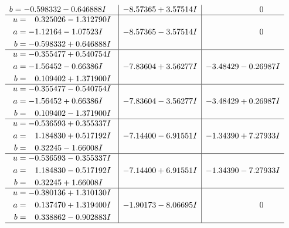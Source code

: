 \documentclass[1p]{elsarticle_modified}
\theoremstyle{definition}
\begin{document}
$$\begin{array}{c|c|c}
\begin{aligned}
b &= -0.598332 - 0.646888 I\end{aligned}
 & -8.57365 + 3.57514 I & \phantom{-0.000000 } 0 \\ \hline\begin{aligned}
u &= \phantom{-}0.325026 - 1.312790 I \\
a &= -1.12164 - 1.07523 I \\
b &= -0.598332 + 0.646888 I\end{aligned}
 & -8.57365 - 3.57514 I & \phantom{-0.000000 } 0 \\ \hline\begin{aligned}
u &= -0.355477 + 0.540754 I \\
a &= -1.56452 - 0.66386 I \\
b &= \phantom{-}0.109402 + 1.371900 I\end{aligned}
 & -7.83604 + 3.56277 I & -3.48429 - 0.26987 I \\ \hline\begin{aligned}
u &= -0.355477 - 0.540754 I \\
a &= -1.56452 + 0.66386 I \\
b &= \phantom{-}0.109402 - 1.371900 I\end{aligned}
 & -7.83604 - 3.56277 I & -3.48429 + 0.26987 I \\ \hline\begin{aligned}
u &= -0.536593 + 0.355337 I \\
a &= \phantom{-}1.184830 + 0.517192 I \\
b &= \phantom{-}0.32245 - 1.66008 I\end{aligned}
 & -7.14400 - 6.91551 I & -1.34390 + 7.27933 I \\ \hline\begin{aligned}
u &= -0.536593 - 0.355337 I \\
a &= \phantom{-}1.184830 - 0.517192 I \\
b &= \phantom{-}0.32245 + 1.66008 I\end{aligned}
 & -7.14400 + 6.91551 I & -1.34390 - 7.27933 I \\ \hline\begin{aligned}
u &= -0.380136 + 1.310130 I \\
a &= \phantom{-}0.137470 + 1.319400 I \\
b &= \phantom{-}0.338862 - 0.902883 I\end{aligned}
 & -1.90173 - 8.06695 I & \phantom{-0.000000 } 0\\
 \hline 
 \end{array}$$\newpage$$\begin{array}{c|c|c}  

\end{array}$$
\end{document}
